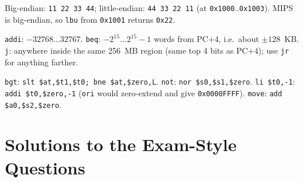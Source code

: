 \documentclass[11pt]{article}
\begin{document}
\begin{solution}[\ref{p:endian}]
Big-endian: \texttt{11 22 33 44}; little-endian: \texttt{44 33 22 11} (at
\texttt{0x1000}..\texttt{0x1003}). MIPS is big-endian, so \texttt{lbu} from
\texttt{0x1001} returns \texttt{0x22}.
\end{solution}

\begin{solution}[\ref{p:range}]
\texttt{addi}: $-32768 \ldots 32767$. \texttt{beq}: $-2^{15}\ldots2^{15}-1$
words from PC$+4$, i.e.\ about $\pm128$~KB. \texttt{j}: anywhere inside the
same 256~MB region (same top 4 bits as PC$+4$); use \texttt{jr} for
anything farther.
\end{solution}

\begin{solution}[\ref{p:pseudo}]
\texttt{bgt}: \texttt{slt \$at,\$t1,\$t0; bne \$at,\$zero,L}.
\texttt{not}: \texttt{nor \$s0,\$s1,\$zero}.
\texttt{li \$t0,-1}: \texttt{addi \$t0,\$zero,-1} (\texttt{ori} would
zero-extend and give \texttt{0x0000FFFF}).
\texttt{move}: \texttt{add \$a0,\$s2,\$zero}.
\end{solution}

\section{Solutions to the Exam-Style Questions}
\end{document}
